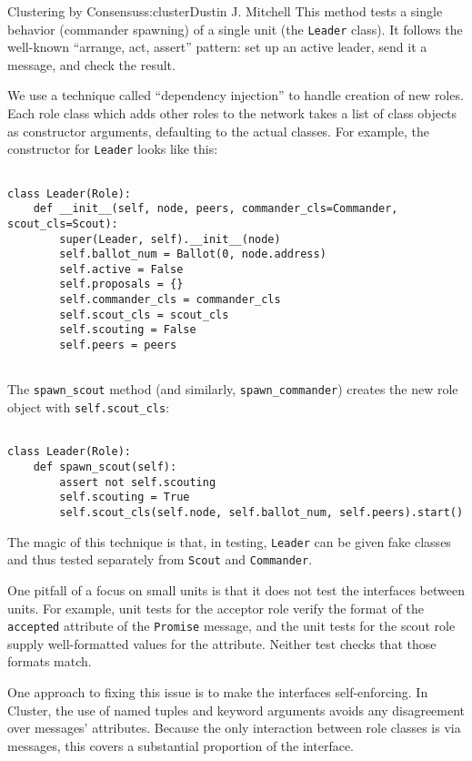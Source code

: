 \begin{aosachapter}{Clustering by Consensus}{s:cluster}{Dustin J. Mitchell}
This method tests a single behavior (commander spawning) of a single
unit (the \texttt{Leader} class). It follows the well-known ``arrange,
act, assert'' pattern: set up an active leader, send it a message, and
check the result.

\label{dependency-injection}

We use a technique called ``dependency injection'' to handle creation of
new roles. Each role class which adds other roles to the network takes a
list of class objects as constructor arguments, defaulting to the actual
classes. For example, the constructor for \texttt{Leader} looks like
this:

\begin{verbatim}

class Leader(Role):
    def __init__(self, node, peers, commander_cls=Commander, scout_cls=Scout):
        super(Leader, self).__init__(node)
        self.ballot_num = Ballot(0, node.address)
        self.active = False
        self.proposals = {}
        self.commander_cls = commander_cls
        self.scout_cls = scout_cls
        self.scouting = False
        self.peers = peers
    
\end{verbatim}

The \texttt{spawn\_scout} method (and similarly,
\texttt{spawn\_commander}) creates the new role object with
\texttt{self.scout\_cls}:

\begin{verbatim}

class Leader(Role):
    def spawn_scout(self):
        assert not self.scouting
        self.scouting = True
        self.scout_cls(self.node, self.ballot_num, self.peers).start()
\end{verbatim}

The magic of this technique is that, in testing, \texttt{Leader} can be
given fake classes and thus tested separately from \texttt{Scout} and
\texttt{Commander}.

\label{interface-correctness}

One pitfall of a focus on small units is that it does not test the
interfaces between units. For example, unit tests for the acceptor role
verify the format of the \texttt{accepted} attribute of the
\texttt{Promise} message, and the unit tests for the scout role supply
well-formatted values for the attribute. Neither test checks that those
formats match.

One approach to fixing this issue is to make the interfaces
self-enforcing. In Cluster, the use of named tuples and keyword
arguments avoids any disagreement over messages' attributes. Because the
only interaction between role classes is via messages, this covers a
substantial proportion of the interface.


\end{aosachapter}
